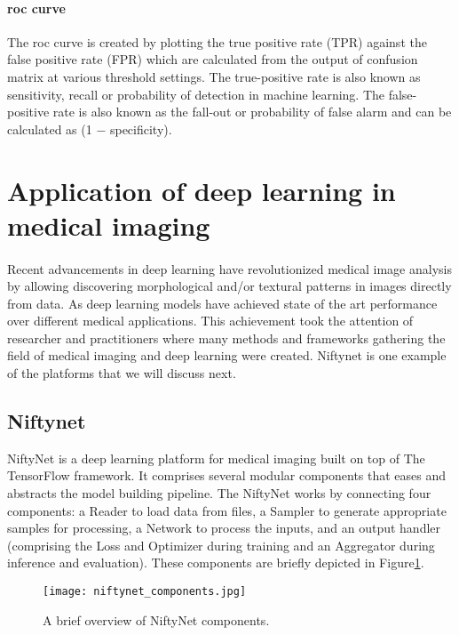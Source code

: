 \paragraph{\acs{roc} curve}
The \acs{roc} curve is created by plotting the true positive rate (TPR) against the false positive rate (FPR) which are calculated from the output of confusion matrix at various threshold settings. The true-positive rate is also known as sensitivity, recall or probability of detection in machine learning. The false-positive rate is also known as the fall-out or probability of false alarm and can be calculated as (1 − specificity).
\section{Application of deep learning in medical imaging}
\paragraph{}
Recent advancements in deep learning have revolutionized medical image analysis by allowing discovering morphological and/or textural patterns in images directly from data. As deep learning models have achieved state of the art performance over different medical applications. This achievement took the attention of researcher and practitioners where many methods and frameworks gathering the field of medical imaging and deep learning were created. Niftynet is one example of the platforms that we will discuss next.
\subsection{Niftynet}
NiftyNet is a deep learning platform for medical imaging built on top of The TensorFlow framework\cite{tensorflow}. It comprises several modular components that eases and abstracts the model building pipeline. The NiftyNet works by connecting four components: a Reader to load data from files, a Sampler to generate appropriate samples for processing, a Network to process the inputs, and an output handler (comprising the Loss and Optimizer during training and an Aggregator during inference and evaluation). These components are briefly depicted in Figure\ref{niftynet_components}.\cite{niftyNet}
\begin{figure}[ht]
 \texttt{[image: niftynet\_components.jpg]}
 \centering         
 \caption{A brief overview of NiftyNet components\cite{niftyNet}.}
 \label{niftynet_components}
\end{figure}